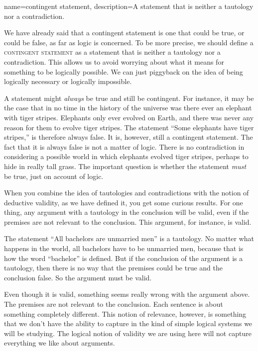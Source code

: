 {
name=contingent statement,
description={A statement that is neither a tautology nor a contradiction.}
}

We have already said that a contingent statement is one that could be true, or could be false, as far as logic is concerned. To be more precise, we should define a \textsc{\gls{contingent statement}}  \label{def:contingent_statement} as a statement that is neither a tautology nor a contradiction. This allows us to avoid worrying about what it means for something to be logically possible. We can just piggyback on the idea of being logically necessary or logically impossible.

A statement might \emph{always} be true and still be contingent. For instance, it may be the case that in no time in the history of the universe was there ever an elephant with tiger stripes. Elephants only ever evolved on Earth, and there was never any reason for them to evolve tiger stripes. The statement ``Some elephants have tiger stripes,'' is therefore always false. It is, however, still a contingent statement. The fact that it is always false is not a matter of logic. There is no contradiction in considering a possible world in which elephants evolved tiger stripes, perhaps to hide in really tall grass. The important question is whether the statement \emph{must} be true, just on account of logic.

When you combine the idea of tautologies and contradictions with the notion of deductive validity, as we have defined it, you get some curious results. For one thing, any argument with a tautology in the conclusion will be valid, even if the premises are not relevant to the conclusion. This argument, for instance, is valid.

\begin{kormanize}
\end{kormanize}

The statement ``All bachelors are unmarried men'' is a tautology. No matter what happens in the world, all bachelors have to be unmarried men, because that is how the word ``bachelor'' is defined. But if the conclusion of the argument is a tautology, then there is no way that the premises could be true and the conclusion false. So the argument must be valid.

Even though it is valid, something seems really wrong with the argument above. The premises are not relevant to the conclusion. Each sentence is about something completely different. This notion of relevance, however, is something that we don't have the ability to capture in the kind of simple logical systems we will be studying. The logical notion of validity we are using here will not capture everything we like about arguments.

